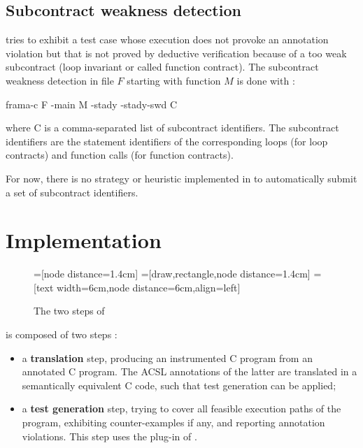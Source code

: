 \documentclass[web]{frama-c-book}
\begin{document}
\section{Subcontract weakness detection}

\stady tries to exhibit a test case whose execution does not provoke an annotation violation but that is not proved by deductive verification because of a too weak subcontract (loop invariant or called function contract). The subcontract weakness detection in file $F$ starting with function $M$ is done with :

\begin{shell}
  frama-c F -main M -stady -stady-swd C
\end{shell}

where C is a comma-separated list of subcontract identifiers. The subcontract identifiers are the statement identifiers of the corresponding loops (for loop contracts) and function calls (for function contracts).

For now, there is no strategy or heuristic implemented in \stady to automatically submit a set of subcontract identifiers.


\chapter{Implementation}


\begin{figure}\centering
  =[node distance=1.4cm]
  =[draw,rectangle,node distance=1.4cm]
  =[text width=6cm,node distance=6cm,align=left]
  \caption{The two steps of \stady\label{fig:stady-steps}}
\end{figure}

\stady is composed of two steps :
\begin{itemize}
\item a \textbf{translation} step, producing an instrumented C program from an annotated C program. The ACSL annotations of the latter are translated in a semantically equivalent C code, such that test generation can be applied;

\item a \textbf{test generation} step, trying to cover all feasible execution paths of the program, exhibiting counter-examples if any, and reporting annotation violations. This step uses the \pathcrawler plug-in of \framac.
\end{itemize}
\end{document}
